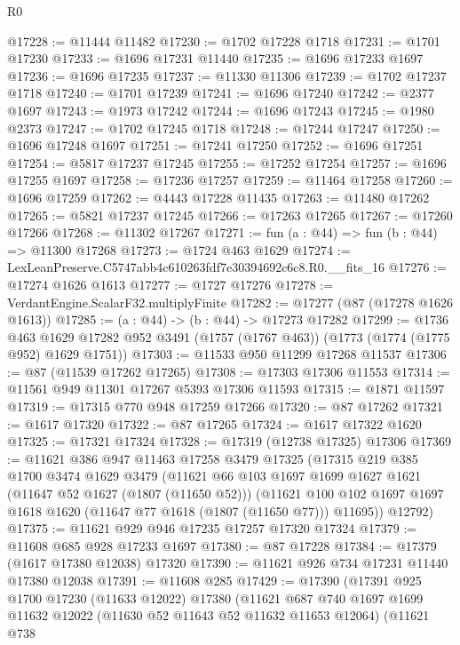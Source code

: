 \begin{lexlean}{R0}
\begin{coremodule}
@17228 := @11444 @11482
@17230 := @1702 @17228 @1718
@17231 := @1701 @17230
@17233 := @1696 @17231 @11440
@17235 := @1696 @17233 @1697
@17236 := @1696 @17235
@17237 := @11330 @11306
@17239 := @1702 @17237 @1718
@17240 := @1701 @17239
@17241 := @1696 @17240
@17242 := @2377 @1697
@17243 := @1973 @17242
@17244 := @1696 @17243
@17245 := @1980 @2373
@17247 := @1702 @17245 @1718
@17248 := @17244 @17247
@17250 := @1696 @17248 @1697
@17251 := @17241 @17250
@17252 := @1696 @17251
@17254 := @5817 @17237 @17245
@17255 := @17252 @17254
@17257 := @1696 @17255 @1697
@17258 := @17236 @17257
@17259 := @11464 @17258
@17260 := @1696 @17259
@17262 := @4443 @17228 @11435
@17263 := @11480 @17262
@17265 := @5821 @17237 @17245
@17266 := @17263 @17265
@17267 := @17260 @17266
@17268 := @11302 @17267
@17271 := fun (a : @44) => fun (b : @44) => @11300 @17268
@17273 := @1724 @463 @1629
@17274 := LexLeanPreserve.C5747abb4c610263fdf7e30394692c6c8.R0.__fits_16
@17276 := @17274 @1626 @1613
@17277 := @1727 @17276
@17278 := VerdantEngine.ScalarF32.multiplyFinite
@17282 := @17277 (@87 (@17278 @1626 @1613))
@17285 := (a : @44) -> (b : @44) -> @17273 @17282
@17299 := @1736
    @463
    @1629
    @17282
    @952
    @3491
    (@1757 (@1767 @463))
    (@1773 (@1774 (@1775 @952) @1629 @1751))
@17303 := @11533 @950 @11299 @17268 @11537
@17306 := @87 (@11539 @17262 @17265)
@17308 := @17303 @17306 @11553
@17314 := @11561 @949 @11301 @17267 @5393 @17306 @11593
@17315 := @1871 @11597
@17319 := @17315 @770 @948 @17259 @17266
@17320 := @87 @17262
@17321 := @1617 @17320
@17322 := @87 @17265
@17324 := @1617 @17322 @1620
@17325 := @17321 @17324
@17328 := @17319 (@12738 @17325) @17306
@17369 := @11621
    @386
    @947
    @11463
    @17258
    @3479
    @17325
    (@17315
      @219
      @385
      @1700
      @3474
      @1629
      @3479
      (@11621
        @66
        @103
        @1697
        @1699
        @1627
        @1621
        (@11647 @52 @1627 (@1807 (@11650 @52)))
        (@11621 @100 @102 @1697 @1697 @1618 @1620 (@11647 @77 @1618 (@1807 (@11650 @77))) @11695))
      @12792)
@17375 := @11621 @929 @946 @17235 @17257 @17320 @17324
@17379 := @11608 @685 @928 @17233 @1697
@17380 := @87 @17228
@17384 := @17379 (@1617 @17380 @12038) @17320
@17390 := @11621 @926 @734 @17231 @11440 @17380 @12038
@17391 := @11608 @285
@17429 := @17390
    (@17391
      @925
      @1700
      @17230
      (@11633 @12022)
      @17380
      (@11621
        @687
        @740
        @1697
        @1699
        @11632
        @12022
        (@11630 @52 @11643 @52 @11632 @11653 @12064)
        (@11621
          @738

\end{coremodule}
\end{lexlean}
